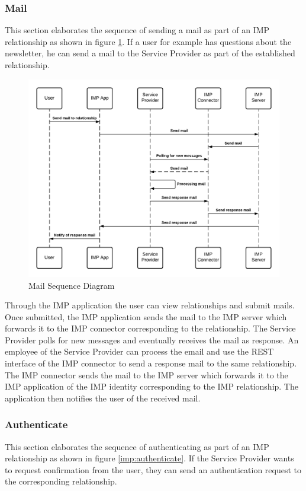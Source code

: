 \subsubsection{Mail}
This section elaborates the sequence of sending a mail as part of an IMP relationship as shown in figure \ref{imp:mail}.
If a user for example has questions about the newsletter, he can send a mail to the Service Provider as part of the established relationship.

\begin{figure}[H]
    \centering
    \includegraphics[scale=0.6]{Diagrams/IMP Use Case Mail Sequence Diagram.pdf}
    \caption{Mail Sequence Diagram}
    \label{imp:mail}
\end{figure}

Through the IMP application the user can view relationships and submit mails. Once submitted, the IMP application sends the mail to the IMP server which forwards it to the IMP connector corresponding to the relationship. The Service Provider polls for new messages and eventually receives the mail as response. An employee of the Service Provider can process the email and use the REST interface of the IMP connector to send a response mail to the same relationship. The IMP connector sends the mail to the IMP server which forwards it to the IMP application of the IMP identity corresponding to the IMP relationship. The application then notifies the user of the received mail.

\subsubsection{Authenticate}
This section elaborates the sequence of authenticating as part of an IMP relationship as shown in figure \ref{imp:authenticate}.
If the Service Provider wants to request confirmation from the user, they can send an authentication request to the corresponding relationship.


